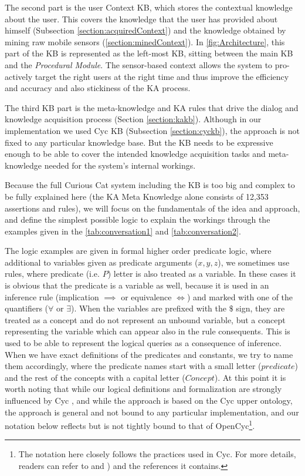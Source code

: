 The second part is the user Context KB, which stores the contextual knowledge 
about the user. This covers the knowledge that the user has provided about 
himself (Subsection \ref{section:acquiredContext}) and the knowledge obtained by mining raw mobile sensors (\autoref{section:minedContext}). In \autoref{fig:Architecture}, this part of the KB is represented 
as the left-most KB, sitting between the main KB and the 
\emph{Procedural Module}. The sensor-based context allows the system to 
pro-actively target the right users at the right time and thus improve the 
efficiency and accuracy and also stickiness of the KA process.

The third KB part is the meta-knowledge and KA rules that drive the dialog and 
knowledge acquisition process (Section \ref{section:kakb}). Although in our 
implementation we 
used Cyc KB (Subsection \ref{section:cyckb}), the approach is not 
fixed to any particular knowledge base. But the KB needs to be expressive
enough to be able to cover the intended knowledge acquisition tasks and 
meta-knowledge needed for the system's internal workings. 

Because the full Curious Cat system including the KB is too big and complex to 
be fully explained here (the KA Meta Knowledge alone consists of 12,353 
assertions and rules), we will focus on the fundamentals of the idea and 
approach, and define the simplest possible logic to explain the workings 
through the examples given in the \autoref{tab:conversation1} and 
\autoref{tab:conversation2}. 

The logic examples are given in formal higher order predicate logic, where
additional to variables given as predicate arguments ($x, y, z$), we sometimes
use rules, where predicate (i.e. $P$) letter is also treated as a variable. 
In these cases it is
obvious that the predicate is a variable as well, because it is used in an
inference rule (implication $\implies$ or equivalence $\iff$) and marked with
one of the quantifiers ($\forall$ or $\exists$). When the variables are
prefixed with the $\$$ sign, they are treated as a concept and do not
represent an unbound variable, but a concept representing the variable which
can appear also in the rule consequents. This is used to be able to represent
the logical queries as a consequence of inference.
When we have exact definitions of the predicates and constants, we try to name
them accordingly, where the predicate names start with a small letter 
($predicate$) and the rest of the 
concepts with a capital letter ($Concept$). At this point it is worth noting 
that while our logical definitions and formalization are strongly influenced by 
Cyc \parencite{Lenat1995}, and while the approach is based on the Cyc upper 
ontology, the approach is general and not bound to any particular 
implementation, and our notation below reflects but is not tightly bound to 
that of OpenCyc\footnote{The notation here closely follows the practices used in 
Cyc. For more details, readers can refer to \parencite{Lenat1995} and
\parencite{Matuszek2006}) and the references it contains.}. 

